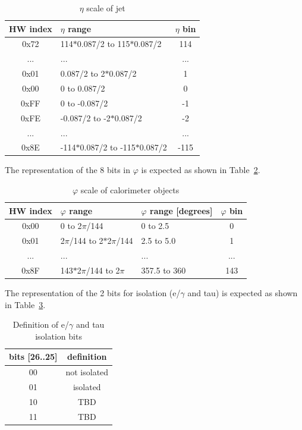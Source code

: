 \begin{table}[htdp]
\caption{$\eta$ scale of jet}
\begin{center}
\begin{tabular}{|c|l|c|}\hline
\textbf{HW index}& \textbf{$\eta$ range} & \textbf{$\eta$ bin}\\\hline\hline
0x72 & 114$*$0.087/2 to 115$*$0.087/2 & 114\\\hline
... & ... & ...\\\hline
0x01 & 0.087/2 to 2$*$0.087/2 & 1\\\hline
0x00 & 0 to 0.087/2 & 0\\\hline
0xFF & 0 to -0.087/2 & -1\\\hline
0xFE & -0.087/2 to -2$*$0.087/2 & -2\\\hline
... & ... & ...\\\hline
0x8E & -114$*$0.087/2 to -115$*$0.087/2 & -115\\\hline
\end{tabular}
\end{center}
\label{tab:gtl:calo_eta_scale}
\end{table}

The representation of the 8 bits in $\varphi$ is expected as shown in Table~\ref{tab:gtl:calo_phi_scale}.\\
 
\begin{table}[htdp]
\begin{center}
\begin{tabular}{|c|l|l|c|}\hline
HW index & $\varphi$ range & $\varphi$ range [degrees] & $\varphi$ bin\\\hline\hline
0x00 & 0 to 2$\pi$/144 & 0 to 2.5 & 0\\\hline
0x01 & 2$\pi$/144 to 2$*$2$\pi$/144 & 2.5 to 5.0 & 1\\\hline
... & ... & ... & ...\\\hline
0x8F & 143$*$2$\pi$/144 to 2$\pi$ & 357.5 to 360 & 143\\\hline
\end{tabular}
\end{center}
\caption{$\varphi$ scale of calorimeter objects}
\label{tab:gtl:calo_phi_scale}
\end{table}

The representation of the 2 bits for isolation (e/$\gamma$ and tau) is expected as shown in Table~\ref{tab:gtl:eg_tau_iso_bits}.\\

\begin{table}[ht]
\caption{Definition of e/$\gamma$ and tau isolation bits}
\vspace{5mm}
\centering
\begin{tabular}{|c|c|}\hline
bits [26..25] & definition \\\hline\hline
00 & not isolated \\
01 & isolated \\
10 & TBD \\
11 & TBD \\\hline
\end{tabular}
\label{tab:gtl:eg_tau_iso_bits}
\end{table}


